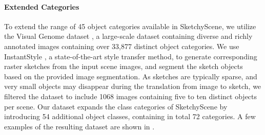 \paragraph{Extended Categories}
To extend the range of 45 object categories available in SketchyScene, we utilize the Visual Genome dataset \cite{VisualGenome2017}, a large-scale dataset containing diverse and richly annotated images containing over 33,877 distinct object categories. 
We use InstantStyle \cite{Wang2024InstantStyleFL}, a state-of-the-art style transfer method, to generate corresponding raster sketches from the input scene images, and segment the sketch objects based on the provided image segmentation. As sketches are typically sparse, and very small objects may disappear during the translation from image to sketch, we filtered the dataset to include 1068 images containing five to ten distinct objects per scene. Our dataset expands the class categories of SketchyScene by introducing 54 additional object classes, containing in total 72 categories. A few examples of the resulting dataset are shown in .












